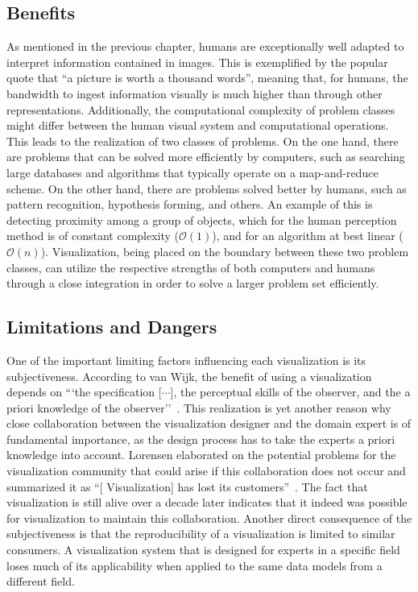 \subsection{Benefits} \label{cha:intro:vis:benefits}
As mentioned in the previous chapter, humans are exceptionally well adapted to interpret information contained in images.  This is exemplified by the popular quote that ``a picture is worth a thousand words'', meaning that, for humans, the bandwidth to ingest information visually is much higher than through other representations.  Additionally, the computational complexity of problem classes might differ between the human visual system and computational operations.  This leads to the realization of two classes of problems.  On the one hand, there are problems that can be solved more efficiently by computers, such as searching large databases and algorithms that typically operate on a map-and-reduce scheme.  On the other hand, there are problems solved better by humans, such as pattern recognition, hypothesis forming, and others.  An example of this is detecting proximity among a group of objects, which for the human perception method is of constant complexity ($\mathcal{O}\left( 1 \right)$), and for an algorithm at best linear ($\mathcal{O}\left( n \right)$).  Visualization, being placed on the boundary between these two problem classes, can utilize the respective strengths of both computers and humans through a close integration in order to solve a larger problem set efficiently.

\subsection{Limitations and Dangers} \label{cha:intro:vis:limitations}
One of the important limiting factors influencing each visualization is its subjectiveness.  According to van Wijk, the benefit of using a visualization depends on ```the specification [$\cdots$], the perceptual skills of the observer, and the a priori knowledge of the observer''~\cite{van2005value}.  This realization is yet another reason why close collaboration between the visualization designer and the domain expert is of fundamental importance, as the design process has to take the experts a priori knowledge into account.  Lorensen elaborated on the potential problems for the visualization community that could arise if this collaboration does not occur and summarized it as ``[ Visualization] has lost its customers''~\cite{lorensen2004death}.  The fact that visualization is still alive over a decade later indicates that it indeed was possible for visualization to maintain this collaboration.  Another direct consequence of the subjectiveness is that the reproducibility of a visualization is limited to similar consumers.  A visualization system that is designed for experts in a specific field loses much of its applicability when applied to the same data models from a different field.

